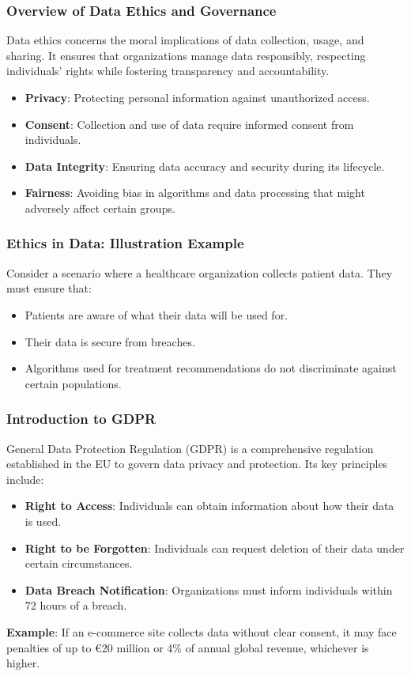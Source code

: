 \documentclass[aspectratio=169]{beamer}
\begin{document}
\begin{frame}[fragile]
    \frametitle{Overview of Data Ethics and Governance}
    Data ethics concerns the moral implications of data collection, usage, and sharing. It ensures that organizations manage data responsibly, respecting individuals’ rights while fostering transparency and accountability.

    \begin{itemize}
        \item \textbf{Privacy}: Protecting personal information against unauthorized access.
        \item \textbf{Consent}: Collection and use of data require informed consent from individuals.
        \item \textbf{Data Integrity}: Ensuring data accuracy and security during its lifecycle.
        \item \textbf{Fairness}: Avoiding bias in algorithms and data processing that might adversely affect certain groups.
    \end{itemize}
\end{frame}

\begin{frame}[fragile]
    \frametitle{Ethics in Data: Illustration Example}
    Consider a scenario where a healthcare organization collects patient data. They must ensure that:
    \begin{itemize}
        \item Patients are aware of what their data will be used for.
        \item Their data is secure from breaches.
        \item Algorithms used for treatment recommendations do not discriminate against certain populations.
    \end{itemize}
\end{frame}

\begin{frame}[fragile]
    \frametitle{Introduction to GDPR}
    General Data Protection Regulation (GDPR) is a comprehensive regulation established in the EU to govern data privacy and protection. Its key principles include:
    \begin{itemize}
        \item \textbf{Right to Access}: Individuals can obtain information about how their data is used.
        \item \textbf{Right to be Forgotten}: Individuals can request deletion of their data under certain circumstances.
        \item \textbf{Data Breach Notification}: Organizations must inform individuals within 72 hours of a breach.
    \end{itemize}

    \textbf{Example}: If an e-commerce site collects data without clear consent, it may face penalties of up to €20 million or 4\% of annual global revenue, whichever is higher.
\end{frame}
\end{document}
